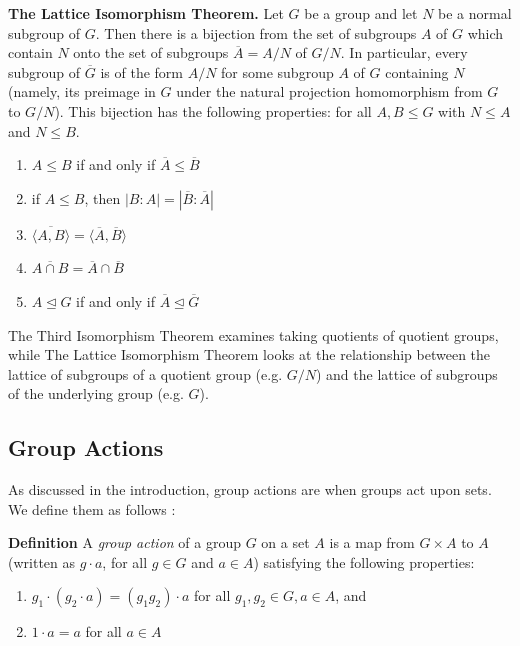 \documentclass[11pt, reqno]{amsart}
\theoremstyle{plain}
\theoremstyle{definition}
\theoremstyle{example}
\def\normeq{\unlhd}
\begin{document}
\textbf{The Lattice Isomorphism Theorem.} Let $G$ be a group and let $N$ be a normal subgroup of $G$. Then there is a bijection from the set of subgroups $A$ of $G$ which contain $N$ onto the set of subgroups $\overline{A} = A/N$ of $G/N$. In particular, every subgroup of $\overline{G}$ is of the form $A/N$ for some subgroup $A$ of $G$ containing $N$ (namely, its preimage in $G$ under the natural projection homomorphism from $G$ to $G/N$). This bijection has the following properties: for all $A, B \leq G$ with $N \leq A$ and $N \leq B$.
\begin{enumerate}
\item $A \leq B$ if and only if $\overline{A} \leq \overline{B}$
\item if $A \leq B$, then $|B : A| = |\overline{B} : \overline{A}|$
\item $\overline{\langle A, B \rangle} = \langle \overline{A}, \overline{B} \rangle$
\item $\overline{A \cap B} = \overline{A} \cap \overline{B}$
\item $A \normeq G$ if and only if $\overline{A} \normeq \overline{G}$
\end{enumerate}

The Third Isomorphism Theorem examines taking quotients of quotient groups, while The Lattice Isomorphism Theorem looks at the relationship between the lattice of subgroups of a quotient group (e.g. $G/N$) and the lattice of subgroups of the underlying group (e.g. $G$).

\subsection{Group Actions}

\par
As discussed in the introduction, group actions are when groups act upon sets. We define them as follows \cite[\S 1.7, p. 41]{dummit}:

\par
\textbf{Definition} A \textit{group action} of a group $G$ on a set $A$ is a map from $G \times A$ to $A$ (written as $g \cdot a$, for all $g \in G$ and $a \in A$) satisfying the following properties:
\begin{enumerate}
\item $g_1 \cdot (g_2 \cdot a) = (g_1g_2) \cdot a$ for all $g_1, g_2 \in G, a \in A$, and
\item $1 \cdot a = a$ for all $a \in A$
\end{enumerate}
\end{document}
